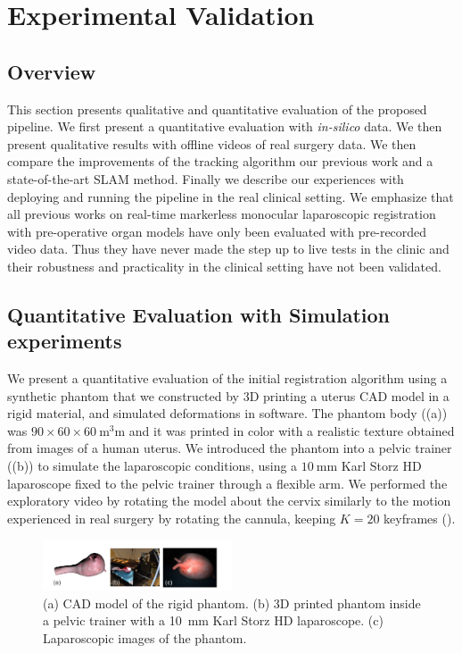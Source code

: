 
\section{Experimental Validation}
\label{sec:experiments}
\subsection{Overview}
This section presents qualitative and quantitative evaluation of the proposed pipeline. We first present a quantitative evaluation with \textit{in-silico} data. We then present qualitative results with offline videos of real surgery data. We then compare the improvements of the tracking algorithm \wrt our previous work and a state-of-the-art SLAM method. Finally we describe our experiences with deploying and running the pipeline in the real clinical setting. We emphasize that all previous works on real-time markerless monocular laparoscopic registration with pre-operative organ models have only been evaluated with pre-recorded video data. Thus they have never made the step up to live tests in the clinic and their robustness and practicality in the clinical setting have not been validated. 

\subsection{Quantitative Evaluation with Simulation experiments}
\label{sec:experiments_Simulation}
We present a quantitative evaluation of the initial registration algorithm using a synthetic phantom that we constructed by 3D printing a uterus CAD model in a rigid material, and simulated deformations in software.
The phantom body ((a)) was $90 \times 60 \times 60~\si{\cubic\milli\metre}$ and it was printed in color with a realistic texture obtained from images of a human uterus. We introduced the phantom into a pelvic trainer ((b)) to simulate the laparoscopic conditions, using a $\SI{10}{\milli\metre}$ Karl Storz HD laparoscope fixed to the pelvic trainer through a flexible arm. We performed the exploratory video by rotating the model about the cervix similarly to the motion experienced in real surgery by rotating the cannula, keeping $K=20$ keyframes ().
 
\begin{figure}[t]
  \centering
  \includegraphics[width=0.5\textwidth]{./figs/phantom.pdf}
\caption{(a) CAD model of the rigid phantom. (b) 3D printed phantom inside a pelvic trainer with a \SI{10}{\milli\metre} Karl Storz HD laparoscope. (c) Laparoscopic images of the phantom.}
\label{fig:phantom}
\end{figure}


